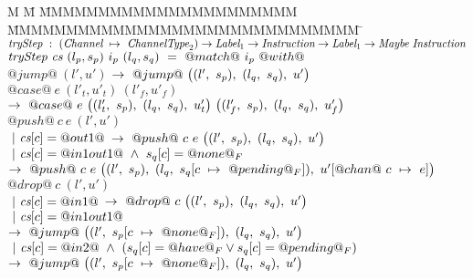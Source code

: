 \begin{figure*}
\begin{tabbing}
M \= M \= MMMMMMMMMMMMMMMMMMMMMM \= MMMMMMMMMMMMMMMMMMMMMMMMMMMMMM \= \kill
$\ti{tryStep} ~:~ \ChanTypeMap \to \Label_1 \to \Instr \to \Label_1 \to \Maybe~\Instr$ \\
$\ti{tryStep} ~\cs~(l_p,s_p)~i_p~(l_q,s_q)~=~@match@~i_p~@with@$ \\

\> $@jump@~(l',u')$ 
\> \> $\to~@jump@~
      \nextStep
        {l'}{s_p}
        {l_q}{s_q}
        {u'}
      $ 
\> 
\\[1ex]

\> $@case@~e~(l'_t,u'_t)~(l'_f,u'_f)$
\> \> $\to~@case@~e~
      \nextStep
        {l'_t}{s_p}
        {l_q}{s_q}
        {u'_t}
      ~
      \nextStep
        {l'_f}{s_p}
        {l_q}{s_q}
        {u'_f}
      $ 
\> 
\\[1ex]

\> $@push@~c~e~(l',u')$ \\
\> \> $~|~\cs[c]=@out1@$ 
\> $\to~@push@~c~e~
      \nextStep
        {l'}
          {s_p}
        {l_q}
          {s_q}
        {u'}
      $ 
\> \\

\> \> $~|~\cs[c]=@in1out1@ ~\wedge~ s_q[c]=@none@_F$ 
\> $\to~@push@~c~e~
      \nextStep
        {l'}
          {s_p}
        {l_q}
          {\HeapUpdateOne{c}{@pending@_F}{s_q}}
        {\HeapUpdateOne{@chan@~c}{e}{u'}}
      $
\> 
\\[1ex]

\> $@drop@~c~(l',u')$ \\
\> \> $~|~\cs[c]=@in1@$
\> \hspace{2em} $\to~@drop@~c~
      \nextStep
        {l'}
          {s_p}
        {l_q}
          {s_q}
        {u'}
      $
\>  \\

\> \> $~|~\cs[c]=@in1out1@$
\> \hspace{2em} $\to~@jump@~
      \nextStep
        {l'}
          {\HeapUpdateOne{c}{@none@_F}{s_p}}
        {l_q}
          {s_q}
        {u'}
      $
\> \\

\> \> $~|~\cs[c]=@in2@ ~\wedge~ (s_q[c]=@have@_F \vee s_q[c]=@pending@_F)$ 
\> \hspace{2em} $\to~@jump@~
      \nextStep
        {l'}
          {\HeapUpdateOne{c}{@none@_F}{s_p}}
        {l_q}
          {s_q}
        {u'}
      $
\> \\




\end{tabbing}
\end{figure*}
